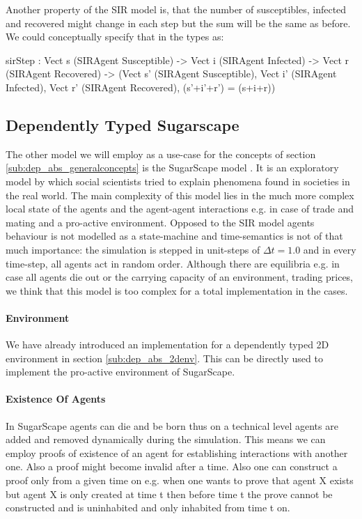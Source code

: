 Another property of the SIR model is, that the number of susceptibles, infected and recovered might change in each step but the sum will be the same as before. We could conceptually specify that in the types as:
\begin{HaskellCode}
sirStep : Vect s (SIRAgent Susceptible) -> 
          Vect i (SIRAgent Infected) ->
          Vect r (SIRAgent Recovered) -> 
          (Vect s' (SIRAgent Susceptible),
           Vect i' (SIRAgent Infected), 
           Vect r' (SIRAgent Recovered), (s'+i'+r') = (s+i+r))
\end{HaskellCode}

\subsection{Dependently Typed Sugarscape}
\label{sub:dep_abs_sugarscape}
The other model we will employ as a use-case for the concepts of section \ref{sub:dep_abs_generalconcepts} is the SugarScape model \cite{epstein_growing_1996}. It is an exploratory model by which social scientists tried to explain phenomena found in societies in the real world. The main complexity of this model lies in the much more complex local state of the agents and the agent-agent interactions e.g. in case of trade and mating and a pro-active environment. Opposed to the SIR model agents behaviour is not modelled as a state-machine and time-semantics is not of that much importance: the simulation is stepped in unit-steps of $\Delta t = 1.0$ and in every time-step, all agents act in random order. Although there are equilibria e.g. in case all agents die out or the carrying capacity of an environment, trading prices, we think that this model is too complex for a total implementation in the cases.

\paragraph{Environment}
We have already introduced an implementation for a dependently typed 2D environment in section \ref{sub:dep_abs_2denv}. This can be directly used to implement the pro-active environment of SugarScape.

\paragraph{Existence Of Agents}
In SugarScape agents can die and be born thus on a technical level agents are added and removed dynamically during the simulation. This means we can employ proofs of existence of an agent for establishing interactions with another one. Also a proof might become invalid after a time. Also one can construct a proof only from a given time on e.g. when one wants to prove that agent X exists but agent X is only created at time t then before time t the prove cannot be constructed and is uninhabited and only inhabited from time t on.

